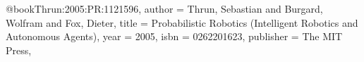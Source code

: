 @book{Thrun:2005:PR:1121596,
 author = {Thrun, Sebastian and Burgard, Wolfram and Fox, Dieter},
 title = {Probabilistic Robotics (Intelligent Robotics and Autonomous Agents)},
 year = {2005},
 isbn = {0262201623},
 publisher = {The MIT Press},
} 
